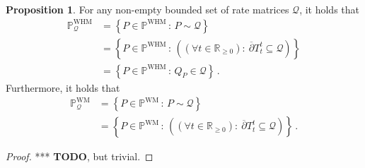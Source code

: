 \documentclass[10pt]{paper}
\theoremstyle{definition}
\newtheorem{proposition}[theorem]{Proposition}
\newcommand{\reals}{\mathbb{R}}
\newcommand{\realsnonneg}{\reals_{\geq 0}}
\newcommand{\processes}{\mathbb{P}}
\newcommand{\wmprocesses}{\processes^{\mathrm{WM}}}
\newcommand{\whmprocesses}{\processes^{\mathrm{WHM}}}
\newcommand{\rateset}{\mathcal{Q}}
\begin{document}
\begin{proposition}\label{prop:process_sets_simplify}
For any non-empty bounded set of rate matrices $\rateset$, it holds that
\begin{align*}
\whmprocesses_\rateset &= \left\{P\in\whmprocesses\,:\,P\sim\rateset\right\} \\
 &= \left\{P\in\whmprocesses\,:\,\left((\forall t\in\realsnonneg):~
\overline{\partial}
{T^t_{t}}\subseteq\rateset
\right) \right\} \\
 &= \left\{P\in\whmprocesses\,:\,Q_P\in\rateset\right\}\,.
\end{align*}
Furthermore, it holds that
\begin{align*}
\wmprocesses_\rateset &= \left\{P\in\wmprocesses\,:\,P\sim\rateset\right\} \\
 &= \left\{P\in\wmprocesses\,:\,\left((\forall t\in\realsnonneg):~
\overline{\partial}
{T^t_{t}}\subseteq\rateset
\right) \right\}\,.
\end{align*}
\end{proposition}
\begin{proof}
*** {\bf TODO}, but trivial.
\end{proof}
\end{document}
